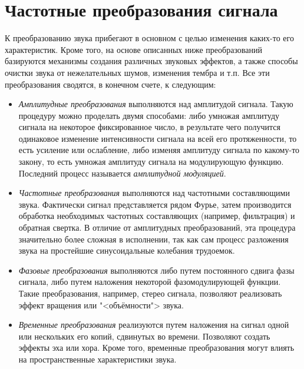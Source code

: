 \documentclass{beamer}
\begin{document}
\section{Частотные преобразования сигнала}
\begin{frame}
К преобразованию звука прибегают в основном с целью изменения каких-то его характеристик. Кроме того, на основе описанных ниже преобразований базируются механизмы создания различных звуковых эффектов, а также способы очистки звука от нежелательных шумов, изменения тембра и т.п. Все эти преобразования сводятся, в конечном счете, к следующим:
\begin{itemize}
  \item \emph{Амплитудные преобразования} выполняются над амплитудой сигнала. Такую процедуру можно проделать двумя способами: либо умножая амплитуду сигнала на некоторое фиксированное число, в результате чего получится одинаковое изменение интенсивности сигнала на всей его протяженности, то есть усиление или ослабление, либо изменяя амплитуду сигнала по какому-то закону, то есть умножая амплитуду сигнала на модулирующую функцию. Последний процесс называется \emph{амплитудной модуляцией}.
\end{itemize}
\end{frame}
\begin{frame}
\begin{itemize}      
  \item \emph{Частотные преобразования} выполняются над частотными составляющими звука. Фактически сигнал представляется рядом Фурье, затем производится обработка необходимых частотных составляющих (например, фильтрация) и обратная свертка. В отличие от амплитудных преобразований, эта процедура значительно более сложная в исполнении, так как сам процесс разложения звука на простейшие синусоидальные колебания трудоемок.
  \item \emph{Фазовые преобразования} выполняются либо путем постоянного сдвига фазы сигнала, либо путем наложения некоторой фазомодулирующей функции. Такие преобразования, например, стерео сигнала, позволяют реализовать эффект вращения или "<объёмности"> звука.
  \item \emph{Временные преобразования} реализуются путем наложения на сигнал одной или нескольких его копий, сдвинутых во времени. Позволяют создать эффекты эха или хора. Кроме того, временные преобразования могут влиять на пространственные характеристики звука.
\end{itemize}
\end{frame}
\end{document}
